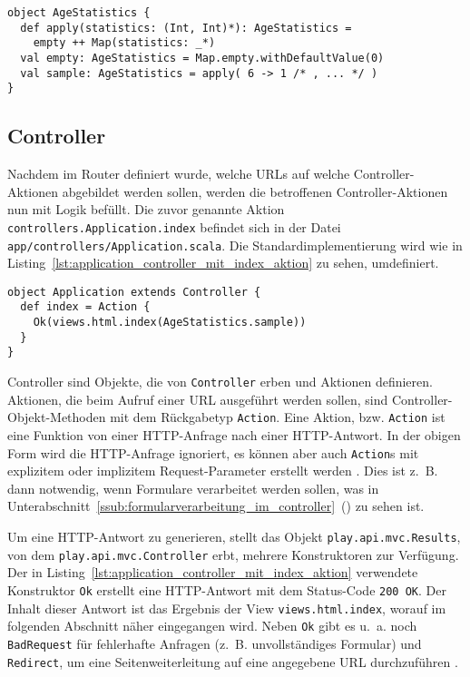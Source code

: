 \begin{lstlisting}[caption=Das AgeStatistics-Hilfsobjekt, label=lst:das_agestatistics_hilfsobjekt]
object AgeStatistics {
  def apply(statistics: (Int, Int)*): AgeStatistics =
    empty ++ Map(statistics: _*)
  val empty: AgeStatistics = Map.empty.withDefaultValue(0)
  val sample: AgeStatistics = apply( 6 -> 1 /* , ... */ )
}
\end{lstlisting}



\subsection{Controller} %
\label{sub:controller}

Nachdem im Router definiert wurde, welche URLs auf welche Controller-Aktionen abgebildet werden sollen, werden die betroffenen Controller-Aktionen nun mit Logik befüllt.
Die zuvor genannte Aktion \lstinline[breaklines=true]|controllers.Application.index| befindet sich in der Datei \lstinline[breaklines=true]|app/controllers/Application.scala|.
Die Standardimplementierung wird wie in Listing~\ref{lst:application_controller_mit_index_aktion} zu sehen, umdefiniert.

\begin{lstlisting}[caption=Der Application-Controller mit index-Aktion, label=lst:application_controller_mit_index_aktion]
object Application extends Controller {
  def index = Action {
    Ok(views.html.index(AgeStatistics.sample))
  }
}
\end{lstlisting}

Controller sind Objekte, die von \lstinline|Controller| erben und Aktionen definieren.
Aktionen, die beim Aufruf einer URL ausgeführt werden sollen, sind Controller-Objekt-Methoden mit dem Rückgabetyp \lstinline|Action|.
Eine Aktion, bzw. \lstinline|Action| ist eine Funktion von einer HTTP-Anfrage nach einer HTTP-Antwort.
In der obigen Form wird die HTTP-Anfrage ignoriert, es können aber auch \lstinline|Action|s mit explizitem oder implizitem Request-Parameter erstellt werden \cite[vgl.][]{play_controllers}.
Dies ist z.~B. dann notwendig, wenn Formulare verarbeitet werden sollen, was in Unterabschnitt~\ref{ssub:formularverarbeitung_im_controller}~() zu sehen ist.

Um eine HTTP-Antwort zu generieren, stellt das Objekt \lstinline|play.api.mvc.Results|, von dem \lstinline|play.api.mvc.Controller| erbt, mehrere Konstruktoren zur Verfügung.
Der in Listing~\ref{lst:application_controller_mit_index_aktion} verwendete Konstruktor \lstinline|Ok| erstellt eine HTTP-Antwort mit dem Status-Code \lstinline|200 OK|.
Der Inhalt dieser Antwort ist das Ergebnis der View \lstinline|views.html.index|, worauf im folgenden Abschnitt näher eingegangen wird.
Neben \lstinline|Ok| gibt es u.~a. noch \lstinline|BadRequest| für fehlerhafte Anfragen (z.~B. unvollständiges Formular) und \lstinline|Redirect|, um eine Seitenweiterleitung auf eine angegebene URL durchzuführen \cite[vgl.][]{play_controllers}.

